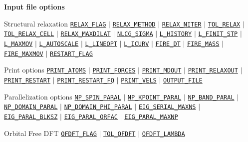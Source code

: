 \begin{frame}[allowframebreaks]{\textbf{Input file options}}
\begin{block}{Structural relaxation}
\hyperlink{RELAX_FLAG}{\texttt{RELAX\_FLAG}} $\vert$ \hyperlink{RELAX_METHOD}{\texttt{RELAX\_METHOD}} $\vert$ \hyperlink{RELAX_NITER}{\texttt{RELAX\_NITER}} $\vert$ \hyperlink{TOL_RELAX}{\texttt{TOL\_RELAX}} $\vert$ \hyperlink{TOL_RELAX_CELL}{\texttt{TOL\_RELAX\_CELL}} $\vert$ \hyperlink{RELAX_MAXDILAT}{\texttt{RELAX\_MAXDILAT}} $\vert$ \hyperlink{NLCG_SIGMA}{\texttt{NLCG\_SIGMA}} $\vert$ \hyperlink{L_HISTORY}{\texttt{L\_HISTORY}} $\vert$ \hyperlink{L_FINIT_STP}{\texttt{L\_FINIT\_STP}} $\vert$ \hyperlink{L_MAXMOV}{\texttt{L\_MAXMOV}} $\vert$ \hyperlink{L_AUTOSCALE}{\texttt{L\_AUTOSCALE}} $\vert$ \hyperlink{L_LINEOPT}{\texttt{L\_LINEOPT}} $\vert$ \hyperlink{L_ICURV}{\texttt{L\_ICURV}} $\vert$ \hyperlink{FIRE_DT}{\texttt{FIRE\_DT}} $\vert$ \hyperlink{FIRE_MASS}{\texttt{FIRE\_MASS}} $\vert$ \hyperlink{FIRE_MAXMOV}{\texttt{FIRE\_MAXMOV}} $\vert$ \hyperlink{RESTART_FLAG}{\texttt{RESTART\_FLAG}}
\end{block}

\begin{block}{Print options}
\hyperlink{PRINT_ATOMS}{\texttt{PRINT\_ATOMS}} $\vert$ \hyperlink{PRINT_FORCES}{\texttt{PRINT\_FORCES}} $\vert$ \hyperlink{PRINT_MDOUT}{\texttt{PRINT\_MDOUT}} $\vert$ \hyperlink{PRINT_RELAXOUT}{\texttt{PRINT\_RELAXOUT}} $\vert$ \hyperlink{PRINT_RESTART}{\texttt{PRINT\_RESTART}} $\vert$ \hyperlink{PRINT_RESTART_FQ}{\texttt{PRINT\_RESTART\_FQ}} $\vert$ \hyperlink{PRINT_VELS}{\texttt{PRINT\_VELS}} $\vert$ \hyperlink{OUTPUT_FILE}{\texttt{OUTPUT\_FILE}}
\end{block}

\begin{block}{Parallelization options}
\hyperlink{NP_SPIN_PARAL}{\texttt{NP\_SPIN\_PARAL}} $\vert$ \hyperlink{NP_KPOINT_PARAL}{\texttt{NP\_KPOINT\_PARAL}} $\vert$ \hyperlink{NP_BAND_PARAL}{\texttt{NP\_BAND\_PARAL}} $\vert$ \hyperlink{NP_DOMAIN_PARAL}{\texttt{NP\_DOMAIN\_PARAL}} $\vert$ \hyperlink{NP_DOMAIN_PHI_PARAL}{\texttt{NP\_DOMAIN\_PHI\_PARAL}} $\vert$ \hyperlink{EIG_SERIAL_MAXNS}{\texttt{EIG\_SERIAL\_MAXNS}} $\vert$ \hyperlink{EIG_PARAL_BLKSZ}{\texttt{EIG\_PARAL\_BLKSZ}} $\vert$ \hyperlink{EIG_PARAL_ORFAC}{\texttt{EIG\_PARAL\_ORFAC}} $\vert$
\hyperlink{EIG_PARAL_MAXNP}{\texttt{EIG\_PARAL\_MAXNP}}
\end{block}

\begin{block}{Orbital Free DFT}
\hyperlink{OFDFT_FLAG}{\texttt{OFDFT\_FLAG}} $\vert$ \hyperlink{TOL_OFDFT}{\texttt{TOL\_OFDFT}} $\vert$ \hyperlink{OFDFT_LAMBDA}{\texttt{OFDFT\_LAMBDA}}
\end{block}
\end{frame}
